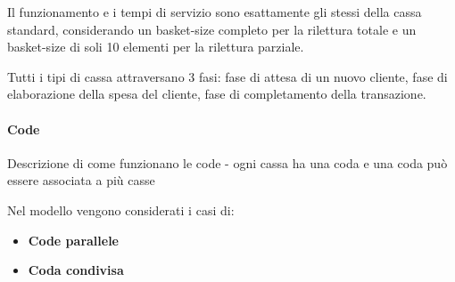 \begin{enumerate}
Il funzionamento e i tempi di servizio sono esattamente gli stessi della cassa standard, considerando un basket-size completo per la rilettura totale e un basket-size di soli 10 elementi per la rilettura parziale.
\end{enumerate}

Tutti i tipi di cassa attraversano 3 fasi: fase di attesa di un nuovo cliente, fase di elaborazione della spesa del cliente, fase di completamento della transazione.

\paragraph{Code} 
Descrizione di come funzionano le code - ogni cassa ha una coda e una
coda può essere associata a più casse

Nel modello vengono considerati i casi di:

\begin{itemize}
\item \textbf{Code parallele}
\item \textbf{Coda condivisa}
\end{itemize}

